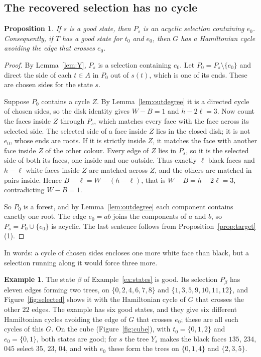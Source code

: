 \documentclass[10pt]{amsart}
\numberwithin{equation}{section}
\newtheorem{proposition}[equation]{Proposition}
\theoremstyle{definition}
\newtheorem{example}[equation]{Example}
\theoremstyle{remark}
\newcommand{\T}{T}
\begin{document}
\subsection*{The recovered selection has no cycle}

\begin{proposition}\label{prop:recover}
If $s$ is a good state, then $P_s$ is an acyclic selection containing $e_0$.
Consequently, if $\T$ has a good state for $t_0$ and $e_0$, then $G$ has a Hamiltonian cycle avoiding the edge that crosses $e_0$.
\end{proposition}

\begin{proof}
By Lemma~\ref{lem:Y}, $P_s$ is a selection containing $e_0$.
Let $P_0=P_s\setminus\{e_0\}$ and direct the side of each $t\in A$ in $P_0$ out of $s(t)$, which is one of its ends.
These are chosen sides for the state $s$.

Suppose $P_0$ contains a cycle $Z$.
By Lemma~\ref{lem:outdegree} it is a directed cycle of chosen sides, so the disk identity gives $W-B=1$ and $h-2\ell=3$.
Now count the faces inside $Z$ through $P_s$, which matches every face with the face across its selected side.
The selected side of a face inside $Z$ lies in the closed disk; it is not $e_0$, whose ends are roots.
If it is strictly inside $Z$, it matches the face with another face inside $Z$ of the other colour.
Every edge of $Z$ lies in $P_s$, so it is the selected side of both its faces, one inside and one outside.
Thus exactly $\ell$ black faces and $h-\ell$ white faces inside $Z$ are matched across $Z$, and the others are matched in pairs inside.
Hence $B-\ell=W-(h-\ell)$, that is $W-B=h-2\ell=3$, contradicting $W-B=1$.

So $P_0$ is a forest, and by Lemma~\ref{lem:outdegree} each component contains exactly one root.
The edge $e_0=ab$ joins the components of $a$ and $b$, so $P_s=P_0\cup\{e_0\}$ is acyclic.
The last sentence follows from Proposition~\ref{prop:target}(1).
\end{proof}

In words: a cycle of chosen sides encloses one more white face than black, but a selection running along it would force three more.

\begin{example}\label{ex:recover}
The state $\beta$ of Example~\ref{ex:states} is good.
Its selection $P_\beta$ has eleven edges forming two trees, on $\{0,2,4,6,7,8\}$ and $\{1,3,5,9,10,11,12\}$, and Figure~\ref{fig:selected} shows it with the Hamiltonian cycle of $G$ that crosses the other $22$ edges.
The example has six good states, and they give six different Hamiltonian cycles avoiding the edge of $G$ that crosses $e_0$; these are all such cycles of this $G$.
On the cube (Figure~\ref{fig:cube}), with $t_0=\{0,1,2\}$ and $e_0=\{0,1\}$, both states are good; for $s$ the tree $Y_s$ makes the black faces $135$, $234$, $045$ select $35$, $23$, $04$, and with $e_0$ these form the trees on $\{0,1,4\}$ and $\{2,3,5\}$.
\end{example}
\end{document}
